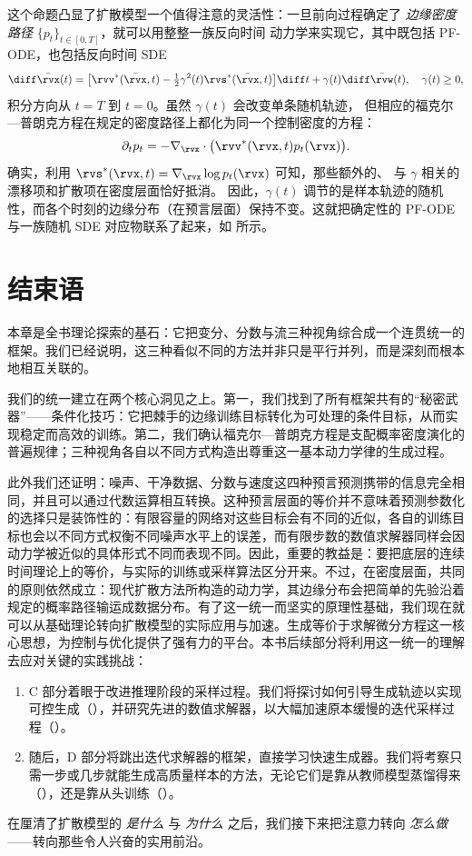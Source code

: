 这个命题凸显了扩散模型一个值得注意的灵活性：一旦前向过程确定了
\emph{边缘密度路径} $\{p_t\}_{t\in[0,T]}$，就可以用整整一族反向时间
动力学来实现它，其中既包括 PF-ODE，也包括反向时间 SDE
\[
\diff\bar\rvx(t)
=
\big[
\rvv^*(\bar\rvx,t)
-\tfrac12\gamma^2(t)\rvs^*(\bar\rvx,t)
\big]\diff t
+
\gamma(t)\diff\bar\rvw(t),
\quad
\gamma(t)\geq0,
\]
积分方向从 $t=T$ 到 $t=0$。虽然 $\gamma(t)$ 会改变单条随机轨迹，
但相应的福克尔—普朗克方程在规定的密度路径上都化为同一个控制密度的方程：
\[
\partial_t p_t
=
-\nabla_{\rvx}\cdot
\bigl(\rvv^*(\rvx,t)p_t(\rvx)\bigr).
\]
确实，利用
$\rvs^*(\rvx,t)=\nabla_{\rvx}\log p_t(\rvx)$ 可知，那些额外的、
与 $\gamma$ 相关的漂移项和扩散项在密度层面恰好抵消。
因此，$\gamma(t)$ 调节的是样本轨迹的随机性，而各个时刻的边缘分布（在预言层面）保持不变。这就把确定性的
PF-ODE 与一族随机 SDE 对应物联系了起来，如
 所示。


\section{结束语}\label{subsec:takeaway-dm-gaussianfm}


本章是全书理论探索的基石：它把变分、分数与流三种视角综合成一个连贯统一的框架。我们已经说明，这三种看似不同的方法并非只是平行并列，而是深刻而根本地相互关联的。

我们的统一建立在两个核心洞见之上。第一，我们找到了所有框架共有的“秘密武器”——条件化技巧：它把棘手的边缘训练目标转化为可处理的条件目标，从而实现稳定而高效的训练。第二，我们确认福克尔—普朗克方程是支配概率密度演化的普遍规律；三种视角各自以不同方式构造出尊重这一基本动力学律的生成过程。


此外我们还证明：噪声、干净数据、分数与速度这四种预言预测携带的信息完全相同，并且可以通过代数运算相互转换。这种预言层面的等价并不意味着预测参数化的选择只是装饰性的：有限容量的网络对这些目标会有不同的近似，各自的训练目标也会以不同方式权衡不同噪声水平上的误差，而有限步数的数值求解器同样会因动力学被近似的具体形式不同而表现不同。因此，重要的教益是：要把底层的连续时间理论上的等价，与实际的训练或采样算法区分开来。不过，在密度层面，共同的原则依然成立：现代扩散方法所构造的动力学，其边缘分布会把简单的先验沿着规定的概率路径输运成数据分布。有了这一统一而坚实的原理性基础，我们现在就可以从基础理论转向扩散模型的实际应用与加速。生成等价于求解微分方程这一核心思想，为控制与优化提供了强有力的平台。本书后续部分将利用这一统一的理解去应对关键的实践挑战：
\begin{enumerate}
    \item C 部分着眼于改进推理阶段的采样过程。我们将探讨如何引导生成轨迹以实现可控生成（），并研究先进的数值求解器，以大幅加速原本缓慢的迭代采样过程（）。
    \item 随后，D 部分将跳出迭代求解器的框架，直接学习快速生成器。我们将考察只需一步或几步就能生成高质量样本的方法，无论它们是靠从教师模型蒸馏得来（），还是靠从头训练（）。
\end{enumerate}

在厘清了扩散模型的 \textit{是什么} 与 \textit{为什么} 之后，我们接下来把注意力转向 \textit{怎么做}——转向那些令人兴奋的实用前沿。